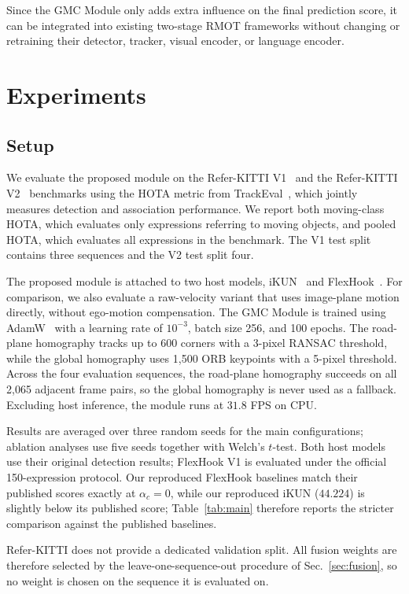 \documentclass{article}
\begin{document}
Since the GMC Module only adds extra influence on the final prediction score, it can be integrated into existing two-stage RMOT frameworks without changing or retraining their detector, tracker, visual encoder, or language encoder.

\section{Experiments}
\label{sec:exp}

\subsection{Setup}
\label{sec:setup}
We evaluate the proposed module on the Refer-KITTI V1~\cite{transrmot} and the Refer-KITTI V2~\cite{temprmot} benchmarks using the HOTA metric from TrackEval~\cite{hota}, which jointly measures detection and association performance. We report both moving-class HOTA, which evaluates only expressions referring to moving objects, and pooled HOTA, which evaluates all expressions in the benchmark. The V1 test split contains three sequences and the V2 test split four.

The proposed module is attached to two host models, iKUN~\cite{ikun} and FlexHook~\cite{flexhook}. For comparison, we also evaluate a raw-velocity variant that uses image-plane motion directly, without ego-motion compensation. The GMC Module is trained using AdamW~\cite{adamw} with a learning rate of $10^{-3}$, batch size 256, and 100 epochs. The road-plane homography tracks up to 600 corners with a 3-pixel RANSAC threshold, while the global homography uses 1,500 ORB keypoints with a 5-pixel threshold. Across the four evaluation sequences, the road-plane homography succeeds on all 2,065 adjacent frame pairs, so the global homography is never used as a fallback. Excluding host inference, the module runs at $31.8$ FPS on CPU.

Results are averaged over three random seeds for the main configurations; ablation analyses use five seeds together with Welch's $t$-test. Both host models use their original detection results; FlexHook V1 is evaluated under the official 150-expression protocol. Our reproduced FlexHook baselines match their published scores exactly at $\alpha_c{=}0$, while our reproduced iKUN ($44.224$) is slightly below its published score; Table~\ref{tab:main} therefore reports the stricter comparison against the published baselines.

Refer-KITTI does not provide a dedicated validation split. All fusion weights are therefore selected by the leave-one-sequence-out procedure of Sec.~\ref{sec:fusion}, so no weight is chosen on the sequence it is evaluated on.
\end{document}
